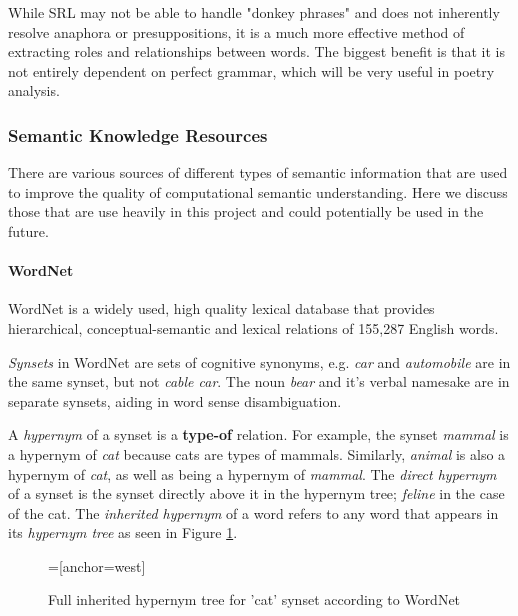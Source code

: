 While SRL may not be able to handle "donkey phrases" and does not inherently resolve anaphora or presuppositions, it is a much more effective method of extracting roles and relationships between words. The biggest benefit is that it is not entirely dependent on perfect grammar, which will be very useful in poetry analysis.


\subsubsection{Semantic Knowledge Resources}
\label{sec:sem-net}
There are various sources of different types of semantic information that are used to improve the quality of computational semantic understanding. Here we discuss those that are use heavily in this project and could potentially be used in the future.

\paragraph{WordNet}
\label{sec:wn}
WordNet is a widely used, high quality lexical database that provides hierarchical, conceptual-semantic and lexical relations of 155,287 English words\cite{miller1995wordnet}. 

\textit{Synsets} in WordNet are sets of cognitive synonyms, e.g. \textit{car} and \textit{automobile} are in the same synset, but not \textit{cable car}. The noun \textit{bear} and it's verbal namesake are in separate synsets, aiding in word sense disambiguation.

A \textit{hypernym} of a synset is a \textbf{type-of} relation. For example, the synset \textit{mammal} is a hypernym of \textit{cat} because cats are types of mammals. Similarly, \textit{animal} is also a hypernym of \textit{cat}, as well as being a hypernym of \textit{mammal}. The \textit{direct hypernym} of a synset is the synset directly above it in the hypernym tree; \textit{feline} in the case of the cat. The \textit{inherited hypernym} of a word refers to any word that appears in its \textit{hypernym tree} as seen in Figure \ref{fig:hypernym-tree-cat}. 

\begin{figure}[h!]
\centering
{}=[anchor=west]
\caption{Full inherited hypernym tree for 'cat' synset according to WordNet}
\label{fig:hypernym-tree-cat}
\end{figure}

